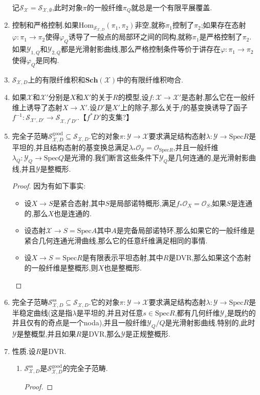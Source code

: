 \begin{enumerate}
    记$\mathcal{S}_{\mathcal{X}}=\mathcal{S}_{\mathcal{X},\emptyset}$,此时对象$\pi$的一般纤维$\pi_Q$就总是一个有限平展覆盖.
    \item 控制和严格控制.如果$\mathrm{Hom}_{\mathcal{S}_{\mathcal{X},D}}(\pi_1,\pi_2)$非空,就称$\pi_1$控制了$\pi_2$;如果存在态射$\varphi:\pi_1\to\pi_2$使得$\varphi_Q$诱导了一般点的局部环之间的同构,就称$\pi_1$是严格控制了$\pi_2$.如果$\mathcal{Y}_{1,Q}$和$\mathcal{Y}_{2,Q}$都是光滑射影曲线,那么严格控制条件等价于讲存在$\varphi:\pi_1\to\pi_2$使得$\varphi_Q$是同构.
    \item $\mathcal{S}_{\mathcal{X},D}$上的有限纤维积和$\textbf{Sch}(\mathcal{X})$中的有限纤维积吻合.
    \item 如果$\mathcal{X}$和$\mathcal{X}'$分别是$X$和$X'$的关于$R$的模型,设$f:\mathcal{X}\to\mathcal{X}'$是态射,那么它在一般纤维上诱导了态射$X\to X'$.设$D'$是$X'$上的除子,那么关于$f$的基变换诱导了函子$f^{-1}:\mathcal{S}_{\mathcal{X}',D'}\to\mathcal{S}_{\mathcal{X},f^*D'}$.【$f^*D'$的支集?】
    \item 完全子范畴$\mathcal{S}_{\mathcal{X},D}^{\mathrm{good}}\subseteq\mathcal{S}_{\mathcal{X},D}$.它的对象$\pi:\mathcal{Y}\to\mathcal{X}$要求满足结构态射$\lambda:\mathcal{Y}\to\mathrm{Spec}R$是平坦的,并且结构态射的基变换总满足$\lambda_*\mathscr{O}_{\mathcal{Y}}=\mathscr{O}_{\mathrm{Spec}R}$,并且一般纤维$\lambda_Q:\mathcal{Y}_Q\to\mathrm{Spec}Q$是光滑的.我们断言这些条件下$\mathcal{Y}_Q$是几何连通的,是光滑射影曲线,并且$\mathcal{Y}$是整概形.
    \begin{proof}
    	
    	因为有如下事实:
    	\begin{itemize}
    		\item 设$X\to S$是紧合态射,其中$S$是局部诺特概形,满足$f_*\mathscr{O}_X=\mathscr{O}_S$,如果$S$是连通的,那么$X$也是连通的.
    		\item 设态射$\mathcal{X}\to S=\mathrm{Spec}A$其中$A$是完备局部诺特环,那么如果它的一般纤维是紧合几何连通光滑曲线,那么它的任意纤维满足相同的事情.
    		\item 设$X\to S=\mathrm{Spec}R$是有限表示平坦态射,其中$R$是DVR,那么如果这个态射的一般纤维是整概形,则$X$也是整概形.
    	\end{itemize}
    \end{proof}
    \item 完全子范畴$\mathcal{S}_{\mathcal{X},D}^{\mathrm{ss}}\subseteq\mathcal{S}_{\mathcal{X},D}$.它的对象$\pi:\mathcal{Y}\to\mathcal{X}$要求满足结构态射$\lambda:\mathcal{Y}\to\mathrm{Spec}R$是半稳定曲线(这是指$\lambda$是平坦的,并且对任意$s\in\mathrm{Spec}R$,都有几何纤维$\mathcal{Y}_{\overline{s}}$是既约的并且仅有的奇点是一个noda),并且一般纤维$\mathcal{Y}_Q/Q$是光滑射影曲线.特别的,此时$\mathcal{Y}$是整概型,并且如果$R$是DVR,那么$\mathcal{Y}$是正规整概形.
    \item 性质.设$R$是DVR.
    \begin{enumerate}[(1)]
    	\item $\mathcal{S}^{\mathrm{ss}}_{\mathcal{X},D}$是$\mathcal{S}^{\mathrm{good}}_{\mathcal{X},D}$的完全子范畴.
    	\begin{proof}
    		

\end{proof}
\end{enumerate}
\end{enumerate}
